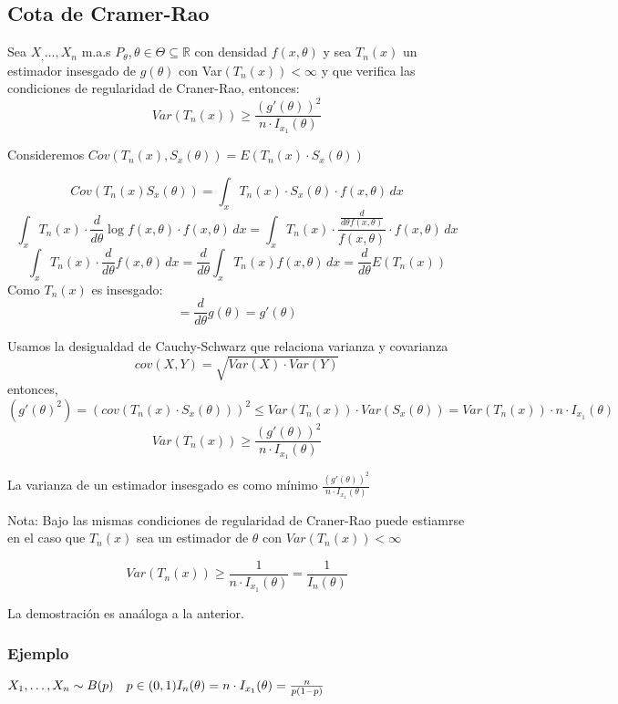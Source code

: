 \subsection{Cota de Cramer-Rao}
Sea $X_,\dots,X_n$ m.a.s $P_\theta,\theta \in \Theta \subseteq \mathbb{R}$ con densidad
$f(x,\theta)$ y sea $T_n(x)$ un estimador insesgado de $g(\theta)$ con Var$(T_n(x)) < \infty$
y que verifica las condiciones de regularidad de Craner-Rao, entonces:
\[
    Var(T_n(x)) \geq \frac{(g'(\theta))^2}{n \cdot I_{x_1}(\theta)}
\]

\begin{proofs}
    Consideremos $Cov(T_n(x),S_x(\theta))=E(T_n(x)\cdot S_x(\theta))$

\[
Cov(T_n(x)S_x(\theta))=\int_x T_n(x) \cdot S_x(\theta) \cdot f(x,\theta) \,dx
\]\[
\int_x T_n(x) \cdot \frac{d}{d \theta} \log f(x,\theta) \cdot f(x,\theta) \,dx
=\int_x T_n(x) \cdot \frac{\frac{d}{d \theta f(x,\theta)}}{f(x,\theta)} \cdot f(x,\theta) \,dx
\]\[
\int_x T_n(x) \cdot \frac{d}{d \theta} f(x,\theta)\,dx
= \frac{d}{d \theta} \int_x T_n(x) f(x,\theta) \,dx
=\frac{d}{d \theta} E(T_n(x))
\]
Como $T_n(x)$ es insesgado:
\[
=\frac{d}{d \theta} g(\theta)=g'(\theta)
\]

Usamos la desigualdad de Cauchy-Schwarz que relaciona varianza y covarianza
\[
cov(X,Y)=\sqrt{Var(X) \cdot Var(Y)}
\]
entonces,
\[
(g'(\theta)^2)=(cov(T_n(x)\cdot S_x(\theta)))^2 \leq Var(T_n(x)) \cdot Var(S_x(\theta))
=Var(T_n(x)) \cdot n \cdot I_{x_1}(\theta)
\]
\[
    Var(T_n(x)) \geq \frac{(g'(\theta))^2}{n \cdot I_{x_1}(\theta)}
\]

\end{proofs}

La varianza de un estimador insesgado es como mínimo $\frac{(g'(\theta))^2}{n \cdot I_{x_1}(\theta)}$

Nota: Bajo las mismas condiciones de regularidad de Craner-Rao puede estiamrse
en el caso que $T_n(x)$ sea un estimador de $\theta$ con $Var(T_n(x))<\infty$

\[
    Var(T_n(x)) \geq \frac{1}{n \cdot I_{x_1}(\theta)}= \frac{1}{I_n(\theta)}
\]


La demostración es anaáloga a la anterior.

\subsubsection*{Ejemplo}


\(
X_1,\dots,X_n \sim B(p) \quad p \in (0,1)
\\I_n(\theta)=n \cdot I_{x_1}(\theta)=\frac{n}{p(1-p)}
\)

